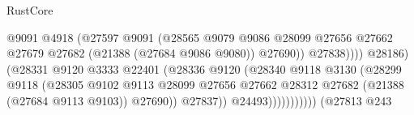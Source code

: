 \begin{lexlean}{RustCore}
\begin{coremodule}
                                                          @9091
                                                          @4918
                                                          (@27597
                                                            @9091
                                                            (@28565
                                                              @9079
                                                              @9086
                                                              @28099
                                                              @27656
                                                              @27662
                                                              @27679
                                                              @27682
                                                              (@21388 (@27684 @9086 @9080))
                                                              @27690))
                                                          @27838))))
                                                  @28186)
                                                (@28331
                                                  @9120
                                                  @3333
                                                  @22401
                                                  (@28336
                                                    @9120
                                                    (@28340
                                                      @9118
                                                      @3130
                                                      (@28299
                                                        @9118
                                                        (@28305
                                                          @9102
                                                          @9113
                                                          @28099
                                                          @27656
                                                          @27662
                                                          @28312
                                                          @27682
                                                          (@21388 (@27684 @9113 @9103))
                                                          @27690))
                                                      @27837))
                                                  @24493)))))))))))
                            (@27813
                              @243

\end{coremodule}
\end{lexlean}
